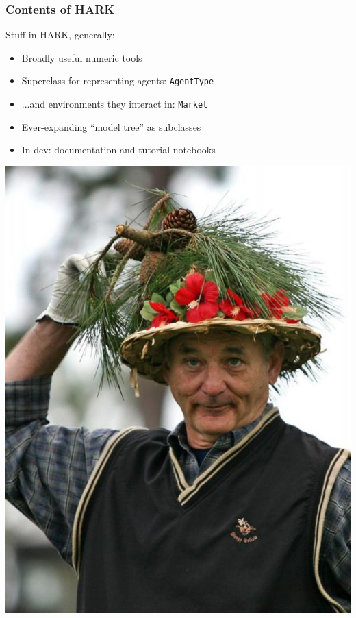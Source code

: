 \documentclass{beamer}
\newcommand{\bi}{\begin{itemize}}
\newcommand{\ei}{\end{itemize}}
\begin{document}
\begin{frame}
\frametitle{Contents of HARK}

\begin{block}{Stuff in HARK, generally:}
\bi
\item Broadly useful numeric tools

\item Superclass for representing agents: \texttt{AgentType}

\item ...and environments they interact in: \texttt{Market}

\item Ever-expanding ``model tree'' as subclasses

\item In dev: documentation and tutorial notebooks
\ei

\end{block}
\end{frame}



\begin{frame}

\begin{center}
\includegraphics[scale=0.3]{BillMurray.jpg}
\end{center}

\end{frame}
\end{document}
